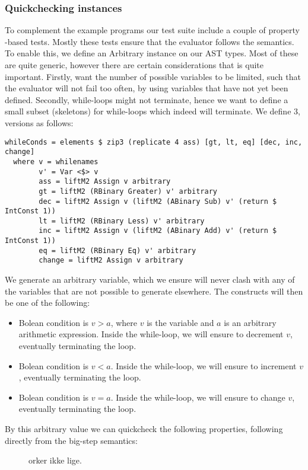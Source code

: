 \subsubsection{Quickchecking instances}
To complement the example programs our test suite include a couple of property -based tests. Mostly these tests ensure that the evaluator follows the semantics.
To enable this, we define an Arbitrary instance on our AST types. Most of these are quite generic, however there are certain considerations that is quite important.
Firstly, want the number of possible variables to be limited, such that the evaluator will not fail too often, by using variables that have not yet been defined.
Secondly, while-loops might not terminate, hence we want to define a small subset (skeletons) for while-loops which indeed will terminate. We define 3, versions as follows:
\begin{lstlisting}
whileConds = elements $ zip3 (replicate 4 ass) [gt, lt, eq] [dec, inc, change]
  where v = whilenames
        v' = Var <$> v
        ass = liftM2 Assign v arbitrary
        gt = liftM2 (RBinary Greater) v' arbitrary
        dec = liftM2 Assign v (liftM2 (ABinary Sub) v' (return $ IntConst 1))
        lt = liftM2 (RBinary Less) v' arbitrary
        inc = liftM2 Assign v (liftM2 (ABinary Add) v' (return $ IntConst 1))
        eq = liftM2 (RBinary Eq) v' arbitrary
        change = liftM2 Assign v arbitrary
\end{lstlisting}
We generate an arbitrary variable, which we ensure will never clash with any of the variables that are not possible to generate elsewhere. The constructs will then be one of the following:
\begin{itemize}
  \item Bolean condition is $v > a$, where $v$ is the variable and $a$ is an arbitrary arithmetic expression. Inside the while-loop, we will ensure to decrement $v$, eventually terminating the loop.
  \item Bolean condition is $v < a$. Inside the while-loop, we will ensure to increment $v$, eventually terminating the loop.
\item Bolean condition is $v = a$. Inside the while-loop, we will ensure to change $v$, eventually terminating the loop.
\end{itemize}

By this arbitrary value we can quickcheck the following properties, following directly from the big-step semantics:

\begin{figure}
orker ikke lige.
\end{figure}


